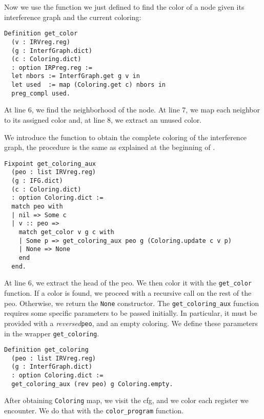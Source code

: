 Now we use the function we just defined to find the color of a node given its interference graph and the current coloring:

\begin{lstlisting}[style=Rocq]
Definition get_color
  (v : IRVreg.reg)
  (g : InterfGraph.dict)
  (c : Coloring.dict)
  : option IRPreg.reg :=
  let nbors := InterfGraph.get g v in
  let used  := map (Coloring.get c) nbors in
  preg_compl used.
\end{lstlisting}

At line 6, we find the neighborhood of the node. At line 7, we map each neighbor to its assigned color and, at line 8, we extract an unused color.

We introduce the function to obtain the complete coloring of the interference graph, the procedure is the same as explained at the beginning of .

\begin{lstlisting}[style=Rocq]
Fixpoint get_coloring_aux
  (peo : list IRVreg.reg)
  (g : IFG.dict)
  (c : Coloring.dict)
  : option Coloring.dict :=
  match peo with
  | nil => Some c
  | v :: peo =>
    match get_color v g c with
    | Some p => get_coloring_aux peo g (Coloring.update c v p)
    | None => None
    end
  end.
\end{lstlisting}

At line 6, we extract the head of the \gls{peo}. We then color it with the \texttt{get\_color} function. If a color is found, we proceed with a recursive call on the rest of the \gls{peo}. Otherwise, we return the \texttt{None} constructor.
The \texttt{get\_coloring\_aux} function requires some specific parameters to be passed initially. In particular, it must be provided with a \textit{reversed}\texttt{peo}, and an empty coloring. We define these parameters in the wrapper \texttt{get\_coloring}.

\begin{lstlisting}[style=Rocq]
Definition get_coloring
  (peo : list IRVreg.reg)
  (g : InterfGraph.dict)
  : option Coloring.dict :=
  get_coloring_aux (rev peo) g Coloring.empty.
\end{lstlisting}

After obtaining \texttt{Coloring} map, we visit the \gls{cfg}, and we color each register we encounter. We do that with the \texttt{color\_program} function.

